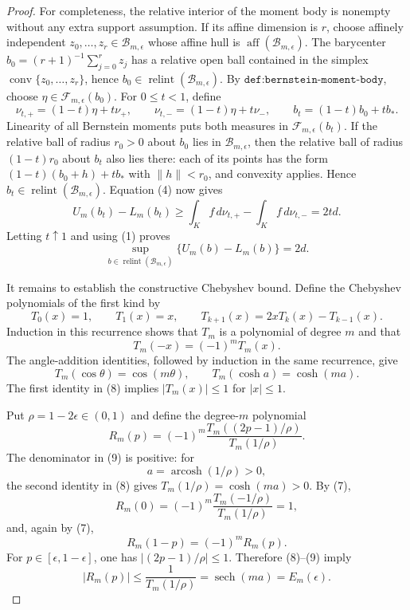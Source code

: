 \documentclass{article}
\begin{document}
\begin{proof}
For completeness, the relative interior of the moment body is nonempty without any extra support assumption.  If its affine dimension is \(r\), choose affinely independent \(z_0,\ldots,z_r\in\mathcal B_{m,\epsilon}\) whose affine hull is \(\operatorname{aff}(\mathcal B_{m,\epsilon})\).  The barycenter \(b_0=(r+1)^{-1}\sum_{j=0}^rz_j\) has a relative open ball contained in the simplex \(\operatorname{conv}\{z_0,\ldots,z_r\}\), hence \(b_0\in\operatorname{relint}(\mathcal B_{m,\epsilon})\).  By \(\texttt{def:bernstein-moment-body}\), choose \(\eta\in\mathcal F_{m,\epsilon}(b_0)\).  For \(0\leq t<1\), define
\[
 \nu_{t,+}=(1-t)\eta+t\nu_+,
 \qquad
 \nu_{t,-}=(1-t)\eta+t\nu_-,
 \qquad
 b_t=(1-t)b_0+tb_*.
\]
Linearity of all Bernstein moments puts both measures in \(\mathcal F_{m,\epsilon}(b_t)\).  If the relative ball of radius \(r_0>0\) about \(b_0\) lies in \(\mathcal B_{m,\epsilon}\), then the relative ball of radius \((1-t)r_0\) about \(b_t\) also lies there: each of its points has the form \((1-t)(b_0+h)+tb_*\) with \(\lVert h\rVert<r_0\), and convexity applies.  Hence \(b_t\in\operatorname{relint}(\mathcal B_{m,\epsilon})\).  Equation (4) now gives
\[
 U_m(b_t)-L_m(b_t)
 \geq\int_Kf\,d\nu_{t,+}-\int_Kf\,d\nu_{t,-}
 =2td.
\]
Letting \(t\uparrow1\) and using (1) proves
\[
 \sup_{b\in\operatorname{relint}(\mathcal B_{m,\epsilon})}
 \{U_m(b)-L_m(b)\}=2d. \tag{6}
\]

It remains to establish the constructive Chebyshev bound.  Define the Chebyshev polynomials of the first kind by
\[
 T_0(x)=1,\qquad T_1(x)=x,
 \qquad T_{k+1}(x)=2xT_k(x)-T_{k-1}(x).
\]
Induction in this recurrence shows that \(T_m\) is a polynomial of degree \(m\) and that
\[
 T_m(-x)=(-1)^mT_m(x). \tag{7}
\]
The angle-addition identities, followed by induction in the same recurrence, give
\[
 T_m(\cos\theta)=\cos(m\theta),
 \qquad
 T_m(\cosh a)=\cosh(ma). \tag{8}
\]
The first identity in (8) implies \(|T_m(x)|\leq1\) for \(|x|\leq1\).

Put \(\rho=1-2\epsilon\in(0,1)\) and define the degree-\(m\) polynomial
\[
 R_m(p)=(-1)^m
 \frac{T_m((2p-1)/\rho)}{T_m(1/\rho)}. \tag{9}
\]
The denominator in (9) is positive: for
\[
 a=\operatorname{arcosh}(1/\rho)>0,
\]
the second identity in (8) gives \(T_m(1/\rho)=\cosh(ma)>0\).  By (7),
\[
 R_m(0)=(-1)^m\frac{T_m(-1/\rho)}{T_m(1/\rho)}=1, \tag{10}
\]
and, again by (7),
\[
 R_m(1-p)=(-1)^mR_m(p). \tag{11}
\]
For \(p\in[\epsilon,1-\epsilon]\), one has \(|(2p-1)/\rho|\leq1\).  Therefore (8)--(9) imply
\[
 |R_m(p)|\leq \frac{1}{T_m(1/\rho)}
 =\operatorname{sech}(ma)=E_m(\epsilon). \tag{12}
\]


\end{proof}
\end{document}
